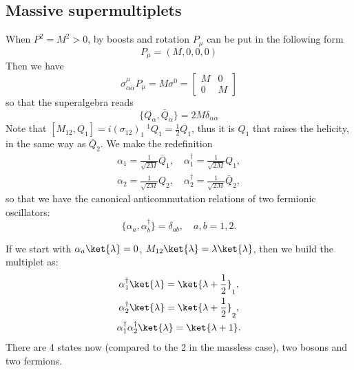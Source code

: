 \subsection{Massive supermultiplets}
When $P^2=M^2>0$, by boosts and rotation $P_\mu$ can be put in the following
form
\begin{equation}
  P_\mu = (M,0,0,0)
\end{equation}
Then we have
\begin{equation}
  \sigma_{\alpha\dot{\alpha}}^\mu P_\mu = M\sigma^0 = 
  \begin{bmatrix} 
    M & 0\\
    0 & M
  \end{bmatrix}
\end{equation}
so that the superalgebra reads
\begin{equation}
  \{Q_\alpha, \bar{Q}_{\dot{\alpha}}\} = 2 M\delta_{\alpha\dot{\alpha}}
\end{equation}
Note that $[M_{12}, Q_1] = i(\sigma_{12})_1\ ^1Q_1= \frac{1}{2}Q_1$, thus it is
$Q_1$ that raises the helicity, in the same way as $\bar{Q}_{\dot{2}}$. We make
the redefinition
\begin{gather}
  \alpha_1 = \frac{1}{\sqrt{2M}}\bar{Q}_{\dot{1}},\quad \alpha_1^\dagger
  = \frac{1}{\sqrt{2M}}Q_1, \\
  \alpha_2 = \frac{1}{\sqrt{2M}}Q_2,\quad \alpha_2^\dagger
  = \frac{1}{\sqrt{2M}}\bar{Q}_\dot{2},
\end{gather}
so that we have the canonical anticommutation relations of two fermionic
oscillators:
\begin{equation}
  \{\alpha_a,\alpha_b^\dagger\}=\delta_{ab},\quad a,b = 1,2.
\end{equation}
\par If we start with $\alpha_a\ket{\lambda} = 0$, $M_{12}\ket{\lambda}
= \lambda\ket{\lambda}$, then we build the multiplet as:
\begin{gather}
  \alpha_1^\dagger\ket{\lambda} = \ket{\lambda + \frac{1}{2}}_1,\\
  \alpha_2^\dagger\ket{\lambda} = \ket{\lambda+\frac{1}{2}}_2,\\
  \alpha_1^\dagger\alpha_2^\dagger\ket{\lambda} = \ket{\lambda+1}.
\end{gather}
There are 4 states now (compared to the 2 in the massless case), two bosons and
two fermions. 
